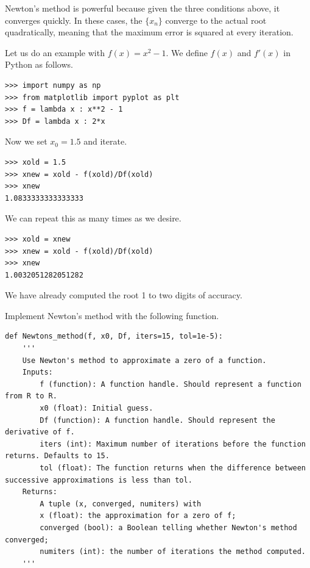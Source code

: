 Newton's method is powerful because given the three conditions above, it converges quickly.
In these cases, the $\{x_n\}$ converge to the actual root quadratically, meaning that the maximum error is squared at every iteration.

Let us do an example with $f(x) = x^2-1$.
We define $f(x)$ and $f'(x)$ in Python as follows.

\begin{lstlisting}
>>> import numpy as np
>>> from matplotlib import pyplot as plt
>>> f = lambda x : x**2 - 1
>>> Df = lambda x : 2*x
\end{lstlisting}

Now we set $x_0 = 1.5$ and iterate.

\begin{lstlisting}
>>> xold = 1.5
>>> xnew = xold - f(xold)/Df(xold)
>>> xnew
1.0833333333333333
\end{lstlisting}
We can repeat this as many times as we desire.
\begin{lstlisting}
>>> xold = xnew
>>> xnew = xold - f(xold)/Df(xold)
>>> xnew
1.0032051282051282
\end{lstlisting}
We have already computed the root 1 to two digits of accuracy.


\begin{problem}
\label{prob:newton_arr}

Implement Newton's method with the following function.
\begin{lstlisting}
def Newtons_method(f, x0, Df, iters=15, tol=1e-5):
    '''
    Use Newton's method to approximate a zero of a function.
    Inputs:
        f (function): A function handle. Should represent a function from R to R.
        x0 (float): Initial guess.
        Df (function): A function handle. Should represent the derivative of f.
        iters (int): Maximum number of iterations before the function returns. Defaults to 15.
        tol (float): The function returns when the difference between successive approximations is less than tol.
    Returns:
        A tuple (x, converged, numiters) with
        x (float): the approximation for a zero of f;
        converged (bool): a Boolean telling whether Newton's method converged;
        numiters (int): the number of iterations the method computed.
    '''
\end{lstlisting}
\end{problem}

